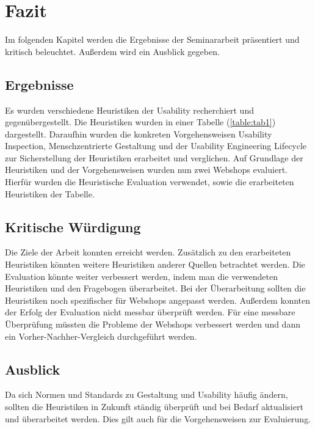 \documentclass[utf8,biblatex]{lni}
\begin{document}
\section{Fazit}
Im folgenden Kapitel werden die Ergebnisse der Seminararbeit präsentiert und kritisch beleuchtet. Außerdem wird ein Ausblick gegeben.


\subsection*{Ergebnisse}
Es wurden verschiedene Heuristiken der Usability recherchiert und gegenübergestellt. Die Heuristiken wurden in einer Tabelle (\ref{table:tab1}) dargestellt. Daraufhin wurden die konkreten Vorgehensweisen Usability Inspection, Menschzentrierte Gestaltung und der Usability Engineering Lifecycle zur Sicherstellung der Heuristiken erarbeitet und verglichen. Auf Grundlage der Heuristiken und der Vorgehensweisen wurden nun zwei Webshops evaluiert. Hierfür wurden die Heuristische Evaluation verwendet, sowie die erarbeiteten Heuristiken der Tabelle.


\subsection*{Kritische Würdigung}
Die Ziele der Arbeit konnten erreicht werden. Zusätzlich zu den erarbeiteten Heuristiken könnten weitere Heuristiken anderer Quellen betrachtet werden. Die Evaluation könnte weiter verbessert werden, indem man die verwendeten Heuristiken und den Fragebogen überarbeitet. Bei der Überarbeitung sollten die Heuristiken noch spezifischer für Webshops angepasst werden. Außerdem konnten der Erfolg der Evaluation nicht messbar überprüft werden. Für eine messbare Überprüfung müssten die Probleme der Webshops verbessert werden und dann ein Vorher-Nachher-Vergleich durchgeführt werden.


\subsection*{Ausblick}
Da sich Normen und Standards zu Gestaltung und Usability häufig ändern, sollten die Heuristiken in Zukunft ständig überprüft und bei Bedarf aktualisiert und überarbeitet werden. Dies gilt auch für die Vorgehensweisen zur Evaluierung. 

\newpage
\printbibliography
\end{document}
